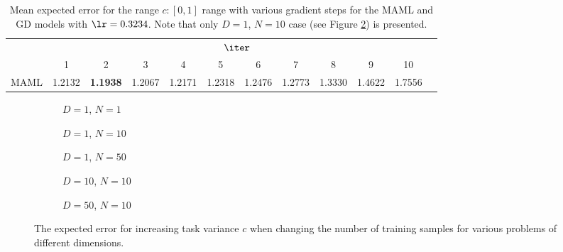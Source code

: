 \begin{table}
  \centering
  \caption{Mean expected error for the range $c:[0,1]$ range with various gradient steps for the MAML and GD models with $\lr=0.3234$. Note that only $D=1$, $N=10$ case (see Figure \ref{fig:linear-c-N-10-D-1}) is presented.}\label{tab:zoom}
  \begin{tabular}{c|c|c|c|c|c|c|c|c|c|c|c|}
    \cline{2-11}
     & \multicolumn{10}{|c|}{$\iter$}\\
    \cline{2-11}
     & 1 & 2 & 3 & 4 & 5 & 6 & 7 & 8 & 9 & 10\\
    \hline
    \multicolumn{1}{|c|}{MAML} & 1.2132 & \textbf{1.1938} & 1.2067 & 1.2171 & 1.2318 & 1.2476 & 1.2773 & 1.3330 & 1.4622 & 1.7556  \\
    \hline
    \end{tabular}
\end{table}

\begin{figure}[!h]
  \centering
    \begin{subfigure}{0.32\textwidth}
      \centering
      \caption{$D=1$, $N=1$}
      \label{fig:linear-c-N-1-D-1}
    \end{subfigure}
    \begin{subfigure}{0.32\textwidth}
      \centering
      \caption{$D=1$, $N=10$}
      \label{fig:linear-c-N-10-D-1}
    \end{subfigure}
    \begin{subfigure}{0.32\textwidth}
      \centering
      \caption{$D=1$, $N=50$}
      \label{fig:linear-c-N-50-D-1}
    \end{subfigure}

    \begin{subfigure}{0.32\textwidth}
      \centering
      \caption{$D=10$, $N=10$}
      \label{fig:linear-c-N-10-D-10}
    \end{subfigure}
    \begin{subfigure}{0.32\textwidth}
      \centering
      \caption{$D=50$, $N=10$}
      \label{fig:linear-c-N-10-D-50}
    \end{subfigure}  

  \caption{The expected error for increasing task variance $c$ when changing the number of training samples for various problems of different dimensions.}
  \label{fig:linear-c}
\end{figure}


